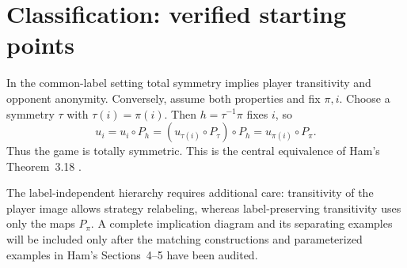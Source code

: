 \section{Classification: verified starting points}
In the common-label setting total symmetry implies player transitivity and
opponent anonymity. Conversely, assume both properties and fix $\pi,i$.
Choose a symmetry $\tau$ with $\tau(i)=\pi(i)$. Then
$h=\tau^{-1}\pi$ fixes $i$, so
\[
 u_i=u_i\circ P_h
     =(u_{\tau(i)}\circ P_\tau)\circ P_h
     =u_{\pi(i)}\circ P_\pi.
\]
Thus the game is totally symmetric. This is the central equivalence of
Ham's Theorem~3.18 \citep{ham2021}.

The label-independent hierarchy requires additional care: transitivity
of the player image allows strategy relabeling, whereas label-preserving
transitivity uses only the maps $P_\pi$. A complete implication diagram and
its separating examples will be included only after the matching constructions
and parameterized examples in Ham's Sections~4--5 have been audited.
